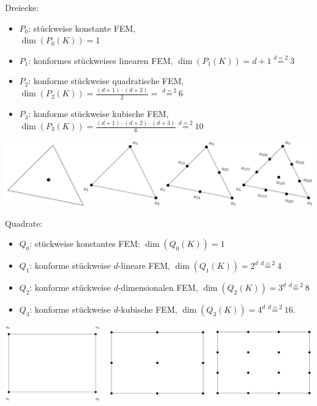 \documentclass[12pt]{scrartcl}
\begin{document}
	\begin{minipage}{0.49\textwidth}
		Dreiecke:
		\begin{itemize}
			\item $P_0$: stückweise konstante FEM,\\ $\dim(P_0(K))=1$
			\item $P_1$: konformes stückweises linearen FEM, $\dim(P_1(K))=d+1\overset{d=2}{=}3$
			\item $P_2$: konforme stückweise quadratische FEM, $\dim(P_2(K))=\frac{(d+1)\cdot(d+2)}{2}=\overset{d=2}{=}6$
			\item $P_3$: konforme stückweise kubische FEM, $\dim(P_3(K))=\frac{(d+1)\cdot(d+2)\cdot(d+3)}{6}\overset{d=2}{=}10$
		\end{itemize}
		\includegraphics[width=1\textwidth]{./pics/FEM_Dreieck.png}
	\end{minipage}
	\begin{minipage}{0.49\textwidth}
		Quadrate:
		\begin{itemize}
			\item $Q_0$: stückweise konstantes FEM: $\dim(Q_0(K))=1$
			\item $Q_1$: konforme stückweise $d$-lineare FEM, $\dim(Q_1(K))=2^d\overset{d=2}{=}4$
			\item $Q_2$: konforme stückweise $d$-dimensionalen FEM, $\dim(Q_2(K))=3^d\overset{d=2}{=}8$
			\item $Q_3$: konforme stückweise $d$-kubische FEM, $\dim(Q_3(K))=4^d\overset{d=2}{=}16$.
		\end{itemize}
		\includegraphics[width=1\textwidth]{./pics/FEM_Quadrat.png}
	\end{minipage}
	
	
	
\end{document}
